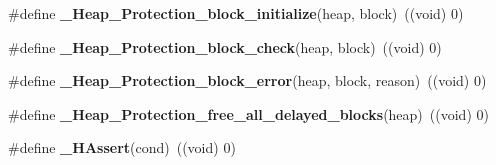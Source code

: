 \begin{DoxyCompactItemize}
\mbox{\label{group__RTEMSScoreHeap_gadb082c4ced17a7121ee138d67eb9cb00}} 
\#define {\bfseries \+\_\+\+Heap\+\_\+\+Protection\+\_\+block\+\_\+initialize}(heap,  block)~((void) 0)
\item 
\mbox{\label{group__RTEMSScoreHeap_ga0e44f410cdcf41d8f5de50ce1adc0636}} 
\#define {\bfseries \+\_\+\+Heap\+\_\+\+Protection\+\_\+block\+\_\+check}(heap,  block)~((void) 0)
\item 
\mbox{\label{group__RTEMSScoreHeap_ga5a119c32e50ac5070ddcccd7d42ed011}} 
\#define {\bfseries \+\_\+\+Heap\+\_\+\+Protection\+\_\+block\+\_\+error}(heap,  block,  reason)~((void) 0)
\item 
\mbox{\label{group__RTEMSScoreHeap_ga940a2498486040631e4c009f99ad3f7c}} 
\#define {\bfseries \+\_\+\+Heap\+\_\+\+Protection\+\_\+free\+\_\+all\+\_\+delayed\+\_\+blocks}(heap)~((void) 0)
\item 
\mbox{\label{group__RTEMSScoreHeap_gad6524914ddb953be87872b2ed91ad05f}} 
\#define {\bfseries \+\_\+\+H\+Assert}(cond)~((void) 0)
\end{DoxyCompactItemize}
